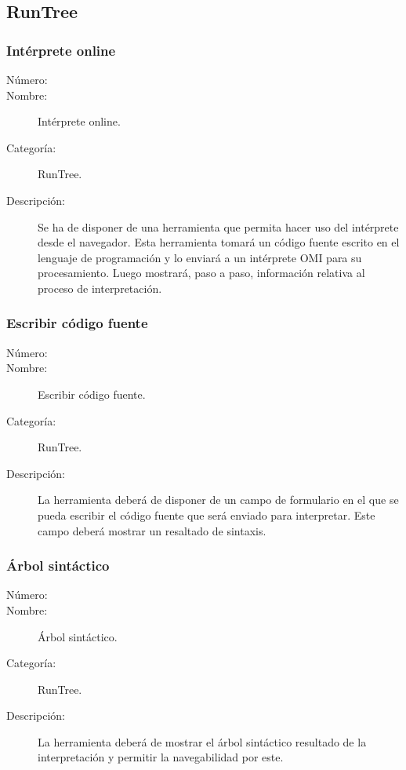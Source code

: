 \subsection{RunTree}

\subsubsection{Intérprete online}
	\begin{description}
		\item [Número:] \cn
		\item [Nombre:] Intérprete online.
		\item [Categoría:] RunTree.
		\item [Descripción:] Se ha de disponer de una herramienta que permita
      hacer uso del intérprete desde el navegador. Esta herramienta tomará un código fuente 
      escrito en el lenguaje de programación y lo enviará a un intérprete OMI para su procesamiento. 
      Luego mostrará, paso a paso, información relativa al proceso de interpretación.
	\end {description}

\subsubsection{Escribir código fuente}
	\begin{description}
		\item [Número:] \cn
		\item [Nombre:] Escribir código fuente.
		\item [Categoría:] RunTree.
		\item [Descripción:] La herramienta deberá de disponer de un campo de formulario en el que se pueda escribir el código fuente
      que será enviado para interpretar. Este campo deberá mostrar un resaltado de sintaxis.
	\end {description}

\subsubsection{Árbol sintáctico}
	\begin{description}
		\item [Número:] \cn
		\item [Nombre:] Árbol sintáctico.
		\item [Categoría:] RunTree.
		\item [Descripción:] La herramienta deberá de mostrar el árbol sintáctico resultado de la interpretación y permitir la navegabilidad por este.
	\end {description}

